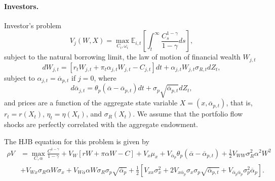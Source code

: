 \paragraph{Investors.} Investor's problem
\begin{equation}
V_{j}(W,X) = \max_{C_i, \omega_{i}}  \mathbb{E}_{i,t}\left[ \int_t^\infty \frac{C_{s}^{1-\gamma}}{1-\gamma} ds \right],
\end{equation}
subject to the natural borrowing limit, the law of motion of financial wealth $W_{j,t}$
\begin{equation}
    d W_{j,t} = \left[ r_t W_{j,t} +\pi_{t} \alpha_{j,t} W_{j,t} - C_{j,t}  \right] dt + \alpha_{j,t} W_{j,t} \sigma_{R,t} dZ_{t},
\end{equation}
subject to $\alpha_{j,t} = \overline{\alpha}_{p,t}$ if $j = 0$, where
\begin{equation}
    d \overline{\alpha}_{j,t} = \theta_p ( \overline{\alpha} - \overline{\alpha}_{p,t}) dt + \sigma_p \sqrt{\overline{\alpha}_{p,t}} d Z_t,
\end{equation}
and prices are a function of the aggregate state variable $X = (x,\overline{\alpha}_{p,t})$, that is, $r_t = r(X_t)$, $\eta_t = \eta(X_t)$, and $\sigma_{R}(X_t)$. We assume that the portfolio flow shocks are perfectly correlated with the aggregate endowment. 

The HJB equation for this problem is given by
\begin{align}
    \rho V &=  \max_{C,\alpha}\frac{C^{1-\gamma}}{1-\gamma} + V_W \left[ r W + \pi \alpha W -C  \right] + V_x \mu_x + V_{\overline{\alpha}_p} \theta_p (\overline{\alpha}-\overline{\alpha}_{p,t})+ \frac{1}{2} V_{WW} \sigma_R^2 \alpha^2 W^2 \nonumber\\
    &+ V_{Wx} \sigma_R \alpha W \sigma_x  + V_{W\overline{\alpha}} \alpha W \sigma_R \sigma_p \sqrt{\overline{\alpha}_p}+ \frac{1}{2} \left[V_{xx} \sigma_x^2 + 2 V_{x \overline{\alpha}_p} \sigma_x \sigma_p \sqrt{\overline{\alpha}_{p,t}} + V_{\overline{\alpha}_p\overline{\alpha}_p} \sigma_p^2\overline{\alpha}_p\right].
\end{align}

